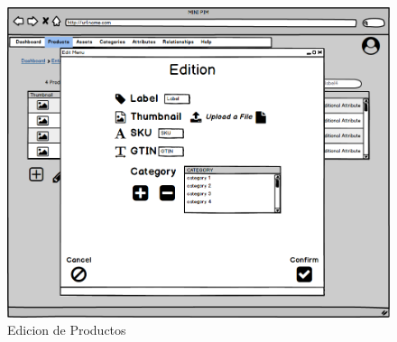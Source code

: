 \begin{figure}[H]
    \includegraphics[width=1\linewidth]{mockups/RF2-X Editar Producto.png}
    \caption{Edicion de Productos}
   \end{figure}
\vspace{1.0cm}

\newpage %